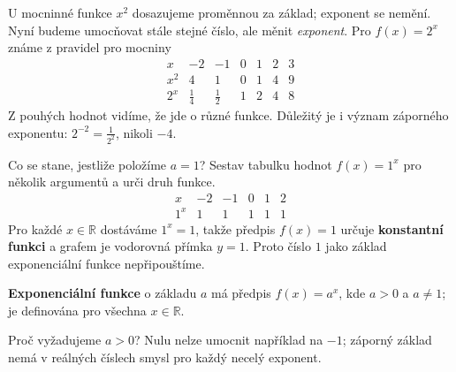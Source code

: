 \documentclass[11pt,a4paper]{article}
\begin{document}
U mocninné funkce $x^2$ dosazujeme proměnnou za základ; exponent se nemění. Nyní budeme umocňovat stále stejné číslo, ale měnit \emph{exponent}. Pro $f(x)=2^x$ známe z pravidel pro mocniny
\[
\begin{array}{c|rrrrrr}
x&-2&-1&0&1&2&3\\\hline
x^2&4&1&0&1&4&9\\
2^x&\frac{1}{4}&\frac{1}{2}&1&2&4&8
\end{array}
\]
Z pouhých hodnot vidíme, že jde o různé funkce. Důležitý je i význam záporného exponentu: $2^{-2}=\frac{1}{2^2}$, nikoli $-4$.\par
\begin{prikladReseniBox}[title={Příklad 1}]
Co se stane, jestliže položíme $a=1$? Sestav tabulku hodnot $f(x)=1^x$ pro několik argumentů a urči druh funkce.
\tcblower
\[
\begin{array}{c|rrrrr}
x&-2&-1&0&1&2\\\hline
1^x&1&1&1&1&1
\end{array}
\]
Pro každé $x\in\mathbb R$ dostáváme $1^x=1$, takže předpis $f(x)=1$ určuje \textbf{konstantní funkci} a grafem je vodorovná přímka $y=1$. Proto číslo $1$ jako základ exponenciální funkce nepřipouštíme.
\end{prikladReseniBox}
\begin{definiceBox}[title={Definice - Exponenciální funkce}]
\textbf{Exponenciální funkce} o základu $a$ má předpis $f(x)=a^x$, kde $a>0$ a $a\ne1$; je definována pro všechna $x\in\mathbb R$. 
\end{definiceBox}
Proč vyžadujeme $a>0$? Nulu nelze umocnit například na $-1$; záporný základ nemá v reálných číslech smysl pro každý necelý exponent.\par
\begin{center}
\end{center}
\end{document}
